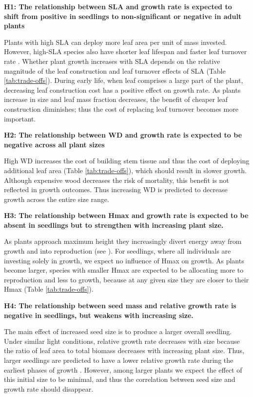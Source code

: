 \documentclass[a4paper,11pt]{article}
\begin{document}
\textbf{H1: The relationship between SLA and growth rate is expected to shift from positive in seedlings to non-significant or negative in adult plants}

Plants with high SLA can deploy more leaf area per unit of mass invested. However, high-SLA species also have shorter leaf lifespan and faster leaf turnover rate \citep{Wright:2004jb}. Whether plant growth increases with SLA depends on the relative magnitude of the leaf construction and leaf turnover effects of SLA (Table \ref{tab:trade-offs}). During early life, when leaf comprises a large part of the plant, decreasing leaf construction cost has a positive effect on growth rate. As plants increase in size and leaf mass fraction decreases, the benefit of cheaper leaf construction diminishes; thus the cost of replacing leaf turnover becomes more important.

\textbf{H2: The relationship between WD and growth rate is expected to be negative across all plant sizes}

High WD increases the cost of building stem tissue and thus the cost of deploying additional leaf area (Table \ref{tab:trade-offs}), which should result in slower growth. Although expensive wood decreases the risk of mortality, this benefit is not reflected in growth outcomes. Thus increasing WD is predicted to decrease growth across the entire size range.

\textbf{H3: The relationship between Hmax and growth rate is expected to be absent in seedlings but to strengthen with increasing plant size.}

As plants approach maximum height they increasingly divert energy away from growth and into reproduction (see \citealt{Thomas:1996do,Thomas-2011, Wenk:2014jz}). For seedlings, where all individuals are investing solely in growth, we expect no influence of Hmax on growth. As plants become larger, species with smaller Hmax are expected to be allocating more to reproduction and less to growth, because at any given size they are closer to their Hmax (Table \ref{tab:trade-offs}).

\textbf{H4: The relationship between seed mass and relative growth rate is negative in seedlings, but weakens with increasing size.}

The main effect of increased seed size is to produce a larger overall seedling. Under similar light conditions, relative growth rate decreases with size because the ratio of leaf area to total biomass decreases with increasing plant size. Thus, larger seedlings are predicted to have a lower relative growth rate during the earliest phases of growth \citep{Turnbull:2012ew}. However, among larger plants we expect the effect of this initial size to be minimal, and thus the correlation between seed size and growth rate should disappear.
\end{document}
